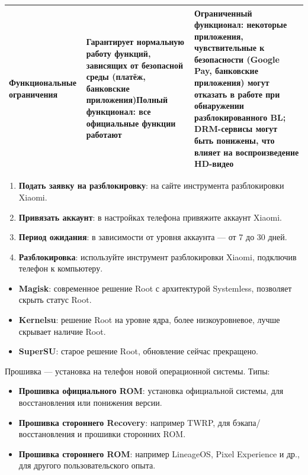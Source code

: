 \begin{center}
\begin{tabularx}{\linewidth}{|X|X|X|}
Функциональные ограничения & Гарантирует нормальную работу функций, зависящих от безопасной среды (платёж, банковские приложения)\newline Полный функционал: все официальные функции работают & Ограниченный функционал: некоторые приложения, чувствительные к безопасности (Google Pay, банковские приложения) могут отказать в работе при обнаружении разблокированного BL; DRM-сервисы могут быть понижены, что влияет на воспроизведение HD-видео \tabularnewline
\hline
\end{tabularx}
\end{center}


\begin{enumerate}
  \item \textbf{Подать заявку на разблокировку}: на сайте инструмента разблокировки Xiaomi.
  \item \textbf{Привязать аккаунт}: в настройках телефона привяжите аккаунт Xiaomi.
  \item \textbf{Период ожидания}: в зависимости от уровня аккаунта — от 7 до 30 дней.
  \item \textbf{Разблокировка}: используйте инструмент разблокировки Xiaomi, подключив телефон к компьютеру.
\end{enumerate}


\begin{itemize}
  \item \textbf{Magisk}: современное решение Root с архитектурой Systemless, позволяет скрыть статус Root.
  \item \textbf{Kernelsu}: решение Root на уровне ядра, более низкоуровневое, лучше скрывает наличие Root.
  \item \textbf{SuperSU}: старое решение Root, обновление сейчас прекращено.
\end{itemize}


Прошивка — установка на телефон новой операционной системы. Типы:

\begin{itemize}
  \item \textbf{Прошивка официального ROM}: установка официальной системы, для восстановления или понижения версии.
  \item \textbf{Прошивка стороннего Recovery}: например TWRP, для бэкапа/восстановления и прошивки сторонних ROM.
  \item \textbf{Прошивка стороннего ROM}: например LineageOS, Pixel Experience и др., для другого пользовательского опыта.
\end{itemize}

